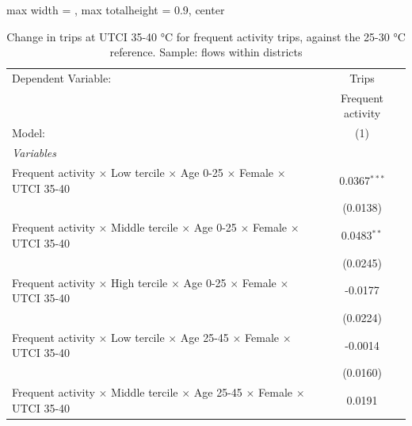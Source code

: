 
\begin{table}[htbp]
   \caption{\label{table_intersectionality_frequent_activity_35-40} Change in trips at UTCI 35-40 °C for frequent activity trips, against the 25-30 °C reference. Sample: flows within districts}
   \centering
   \small
   \begin{adjustbox}{max width = \textwidth, max totalheight = 0.9\textheight, center}
      \begin{tabular}{lc}
         \tabularnewline \midrule \midrule
         Dependent Variable:                                                                                   & Trips\\  
                                                                                                               & Frequent activity \\   
         Model:                                                                                                & (1)\\  
         \midrule
         \emph{Variables}\\
         Frequent activity $\times$ Low tercile $\times$ Age 0-25 $\times$ Female $\times$ UTCI 35-40          & 0.0367$^{***}$\\   
                                                                                                               & (0.0138)\\   
         Frequent activity $\times$ Middle tercile $\times$ Age 0-25 $\times$ Female $\times$ UTCI 35-40       & 0.0483$^{**}$\\   
                                                                                                               & (0.0245)\\   
         Frequent activity $\times$ High tercile $\times$ Age 0-25 $\times$ Female $\times$ UTCI 35-40         & -0.0177\\   
                                                                                                               & (0.0224)\\   
         Frequent activity $\times$ Low tercile $\times$ Age 25-45 $\times$ Female $\times$ UTCI 35-40         & -0.0014\\   
                                                                                                               & (0.0160)\\   
         Frequent activity $\times$ Middle tercile $\times$ Age 25-45 $\times$ Female $\times$ UTCI 35-40      & 0.0191\\   

\end{tabular}
\end{adjustbox}
\end{table}
